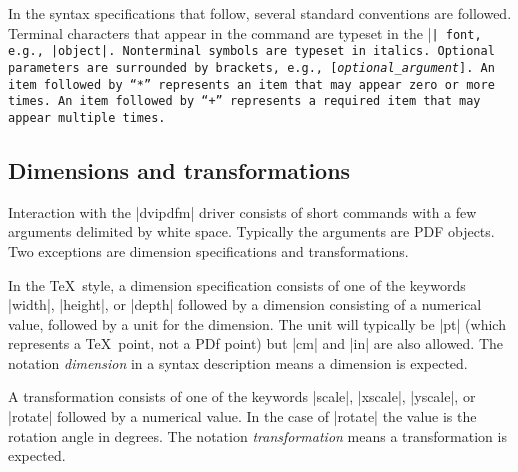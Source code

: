 In the syntax specifications that follow, several
standard conventions are followed.  Terminal
characters that appear in the command 
are typeset in the |\tt| font, e.g., |object|.
Nonterminal symbols are typeset in italics.
Optional parameters are surrounded by brackets, e.g.,
[{\it optional\_argument}].  An item followed
by~``{*}'' represents an item that may appear
zero or more times.  An item followed by~``{+}''
represents a required item that may appear multiple times.

\subsection{Dimensions and transformations}
Interaction with the |dvipdfm| driver consists
of short commands with a few arguments delimited by white space.
Typically the arguments are PDF objects.
Two exceptions are dimension specifications and transformations.

In the \TeX\ style, a dimension specification consists of one of the keywords
|width|, |height|, or |depth| followed by a dimension
consisting of a numerical value, followed by a unit for the dimension.  The
unit will typically be |pt| (which represents a \TeX\ point, not a
PDf point) but |cm| and |in| are also allowed.  The notation
{\it dimension\/} in a syntax description means a dimension is expected.

A transformation consists of one of the keywords |scale|, |xscale|,
|yscale|, or |rotate| followed by a numerical value.  In the
case of |rotate| the value is the rotation angle in degrees.
The notation
{\it transformation} means a transformation is expected. 

